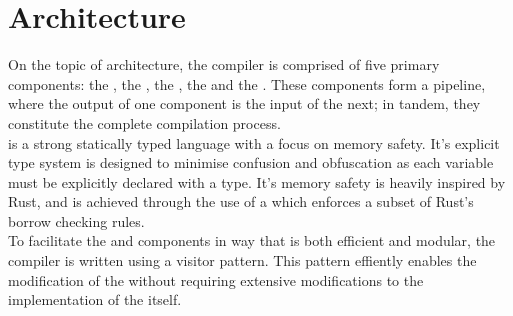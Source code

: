 \section{Architecture}
\label{sec:architecture}

On the topic of architecture, the \lang{} compiler is comprised of five primary
components: the \lexer, the \parser, the \static, the \codeGen{} and the \gcc. These
components form a pipeline, where the output of one component is the input of the
next; in tandem, they constitute the complete compilation process. \\

\lang{} is a strong statically typed language with a focus on memory safety. It's
explicit type system is designed to minimise confusion and obfuscation as each
variable must be explicitly declared with a type. It's memory safety is heavily
inspired by Rust, and is achieved through the use of a \borrowChecker{} which enforces
a subset of Rust's borrow checking rules. \\



To facilitate the \static{} and \codeGen{} components in way that is both efficient
and modular, the \lang{} compiler is written using a visitor pattern. This pattern
effiently enables the modification of the \ast{} without requiring extensive
modifications to the implementation of the \ast{} itself.





